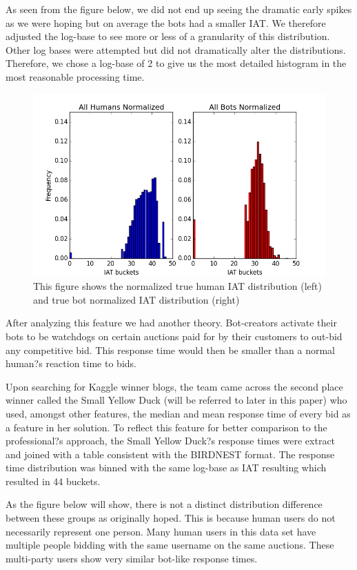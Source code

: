 \documentclass{article} %
\begin{document}
As seen from the figure below, we did not end up seeing the dramatic early spikes as we were hoping but on average the bots had a smaller IAT. We therefore adjusted the log-base to see more or less of a granularity of this distribution. Other log bases were attempted but did not dramatically alter the distributions. Therefore, we chose a log-base of 2 to give us the most detailed histogram in the most reasonable processing time.

\begin{figure}[h]
\centering
{\caption{This figure shows the normalized true human IAT distribution (left) and true bot normalized IAT distribution (right)} \includegraphics[scale=0.5]{img/bird_iat_dist.png}}
\end{figure}

After analyzing this feature we had another theory. Bot-creators activate their bots to be watchdogs on certain auctions paid for by their customers to out-bid any competitive bid. This response time would then be smaller than a normal human?s reaction time to bids.

Upon searching for Kaggle winner blogs, the team came across the second place winner called the Small Yellow Duck (will be referred to later in this paper) who used, amongst other features, the median and mean response time of every bid as a feature in her solution. To reflect this feature for better comparison to the professional?s approach, the Small Yellow Duck?s response times were extract and joined with a table consistent with the BIRDNEST format. The response time distribution was binned with the same log-base as IAT resulting which resulted in 44 buckets.

As the figure below will show, there is not a distinct distribution difference between these groups as originally hoped. This is because human users do not necessarily represent one person. Many human users in this data set have multiple people bidding with the same username on the same auctions. These multi-party users show very similar bot-like response times.
\end{document}
